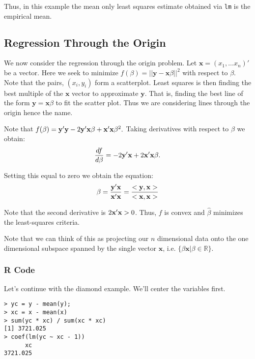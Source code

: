 Thus, in this example the mean only least squares estimate obtained via \texttt{lm} 
is the empirical mean.

\subsection{Regression Through the Origin}


We now consider the regression through the origin problem. 
Let ${\mathbf x} = (x_1, \dots x_n)'$ be a vector. Here we seek to minimize $f(\beta) = || {\mathbf y} - {\mathbf x} \beta ||^2$ with respect to $\beta$. 
Note that the pairs, $(x_i, y_i)$ form a scatterplot. Least squares is then finding the best multiple of the ${\mathbf x}$ vector to approximate ${\mathbf y}$. That is, finding the best line of the form ${\mathbf y} = {\mathbf x}\beta$ to fit the scatter plot. Thus we are considering lines through the origin hence the name.

\vb
Note that $f(\beta) = \mathbf{y}' \mathbf{y} - 2\mathbf{y}' \mathbf{x} \beta +\mathbf{x}' \mathbf{x} \beta^2.$ 
Taking derivatives with respect to $\beta$ we obtain:
$$
\frac{df}{d \beta} = -2{\mathbf{y}' \mathbf{x}} + 2 {\mathbf{x}' \mathbf{x}} \beta.
$$

Setting this equal to zero we obtain the equation:
$$
\beta = \frac{\mathbf{y}' {\mathbf x}}{{\mathbf x}'{\mathbf x}} = \frac{<\mathbf{y}, {\mathbf x}>}{<{\mathbf x},{\mathbf x}>}
$$

Note that the second derivative is $2 \mathbf{x}' \mathbf{x} > 0$. Thus, $f$ is convex and ${\hat \beta}$ minimizes the least-squares criteria.

\vb
%
Note that we can think of this as projecting our $n$ dimensional data onto the one dimensional subspace spanned by the single vector ${\mathbf x}$, i.e. $\{\beta {\mathbf x} | \beta \in \mathbb{R} \}.$

\subsubsection{R Code}


Let's continue with the diamond example. We'll center the variables first.
\begin{verbatim}
> yc = y - mean(y);
> xc = x - mean(x)
> sum(yc * xc) / sum(xc * xc)
[1] 3721.025
> coef(lm(yc ~ xc - 1))
      xc 
3721.025 
\end{verbatim}




